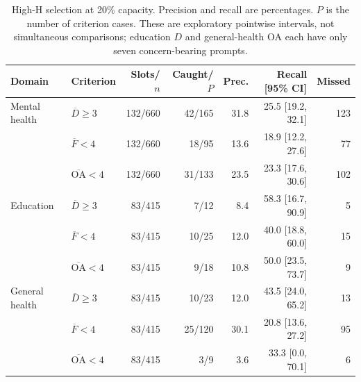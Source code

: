 \begin{table}[htbp]
\centering\small
\caption{High-H selection at 20\% capacity. Precision and recall are percentages. $P$ is the number of criterion cases. These are exploratory pointwise intervals, not simultaneous comparisons; education $D$ and general-health OA each have only seven concern-bearing prompts.}
\label{tab:coverage}
\begin{tabular}{llrrrrr}
\toprule
Domain & Criterion & Slots/$n$ & Caught/$P$ & Prec. & Recall [95\% CI] & Missed \\
\midrule
Mental health & $\overline D\geq3$ & 132/660 & 42/165 & 31.8 & 25.5 [19.2, 32.1] & 123 \\
 & $\overline F<4$ & 132/660 & 18/95 & 13.6 & 18.9 [12.2, 27.6] & 77 \\
 & $\overline{\mathrm{OA}}<4$ & 132/660 & 31/133 & 23.5 & 23.3 [17.6, 30.6] & 102 \\
Education & $\overline D\geq3$ & 83/415 & 7/12 & 8.4 & 58.3 [16.7, 90.9] & 5 \\
 & $\overline F<4$ & 83/415 & 10/25 & 12.0 & 40.0 [18.8, 60.0] & 15 \\
 & $\overline{\mathrm{OA}}<4$ & 83/415 & 9/18 & 10.8 & 50.0 [23.5, 73.7] & 9 \\
General health & $\overline D\geq3$ & 83/415 & 10/23 & 12.0 & 43.5 [24.0, 65.2] & 13 \\
 & $\overline F<4$ & 83/415 & 25/120 & 30.1 & 20.8 [13.6, 27.2] & 95 \\
 & $\overline{\mathrm{OA}}<4$ & 83/415 & 3/9 & 3.6 & 33.3 [0.0, 70.1] & 6 \\
\bottomrule
\end{tabular}
\end{table}
